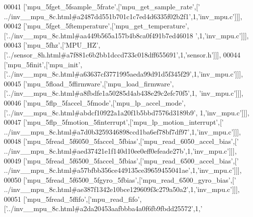 \begin{DoxyCode}
00041   [\textcolor{stringliteral}{'mpu\_5fget\_5fsample\_5frate'},[\textcolor{stringliteral}{'mpu\_get\_sample\_rate'},[\textcolor{stringliteral}{'
      ../inv\_\_mpu\_8c.html#a2487dd551b701c1c7ed4d6335f02b2f1'},1,\textcolor{stringliteral}{'inv\_mpu.c'}]]],
00042   [\textcolor{stringliteral}{'mpu\_5fget\_5ftemperature'},[\textcolor{stringliteral}{'mpu\_get\_temperature'},[\textcolor{stringliteral}{'../inv\_\_mpu\_8c.html#aa449b565a157b4b8ca0f491b7ed46018
      '},1,\textcolor{stringliteral}{'inv\_mpu.c'}]]],
00043   [\textcolor{stringliteral}{'mpu\_5fhz'},[\textcolor{stringliteral}{'MPU\_HZ'},[\textcolor{stringliteral}{'../sensor\_8h.html#a7f881c6b2bb1dccd733c018dff655691'},1,\textcolor{stringliteral}{'sensor.h'}]]],
00044   [\textcolor{stringliteral}{'mpu\_5finit'},[\textcolor{stringliteral}{'mpu\_init'},[\textcolor{stringliteral}{'../inv\_\_mpu\_8c.html#a63637cf3771995aeda99d91d5f345f29'},1,\textcolor{stringliteral}{'inv\_mpu.c'}]]],
00045   [\textcolor{stringliteral}{'mpu\_5fload\_5ffirmware'},[\textcolor{stringliteral}{'mpu\_load\_firmware'},[\textcolor{stringliteral}{'../inv\_\_mpu\_8c.html#a8fbdfe1a50285d4ab438e29c2efc70f5'},1,\textcolor{stringliteral}{
      'inv\_mpu.c'}]]],
00046   [\textcolor{stringliteral}{'mpu\_5flp\_5faccel\_5fmode'},[\textcolor{stringliteral}{'mpu\_lp\_accel\_mode'},[\textcolor{stringliteral}{'../inv\_\_mpu\_8c.html#abdcf10922a1a20f1b5bbd7576d3189b9'},
      1,\textcolor{stringliteral}{'inv\_mpu.c'}]]],
00047   [\textcolor{stringliteral}{'mpu\_5flp\_5fmotion\_5finterrupt'},[\textcolor{stringliteral}{'mpu\_lp\_motion\_interrupt'},[\textcolor{stringliteral}{'
      ../inv\_\_mpu\_8c.html#a7d0b3259346898ccd1ba6ef78bf7df97'},1,\textcolor{stringliteral}{'inv\_mpu.c'}]]],
00048   [\textcolor{stringliteral}{'mpu\_5fread\_5f6050\_5faccel\_5fbias'},[\textcolor{stringliteral}{'mpu\_read\_6050\_accel\_bias'},[\textcolor{stringliteral}{'
      ../inv\_\_mpu\_8c.html#aed37421e1f140d10ee0eff0efeade27b'},1,\textcolor{stringliteral}{'inv\_mpu.c'}]]],
00049   [\textcolor{stringliteral}{'mpu\_5fread\_5f6500\_5faccel\_5fbias'},[\textcolor{stringliteral}{'mpu\_read\_6500\_accel\_bias'},[\textcolor{stringliteral}{'
      ../inv\_\_mpu\_8c.html#a57bfbb356ce449135ce39659455041ae'},1,\textcolor{stringliteral}{'inv\_mpu.c'}]]],
00050   [\textcolor{stringliteral}{'mpu\_5fread\_5f6500\_5fgyro\_5fbias'},[\textcolor{stringliteral}{'mpu\_read\_6500\_gyro\_bias'},[\textcolor{stringliteral}{'
      ../inv\_\_mpu\_8c.html#ae387f1342e10bce129609f3c279a50a2'},1,\textcolor{stringliteral}{'inv\_mpu.c'}]]],
00051   [\textcolor{stringliteral}{'mpu\_5fread\_5ffifo'},[\textcolor{stringliteral}{'mpu\_read\_fifo'},[\textcolor{stringliteral}{'../inv\_\_mpu\_8c.html#a2da20453aafbbba4a0f6fb9fbdd25572'},1,\textcolor{stringliteral}{'
}
\end{DoxyCode}
